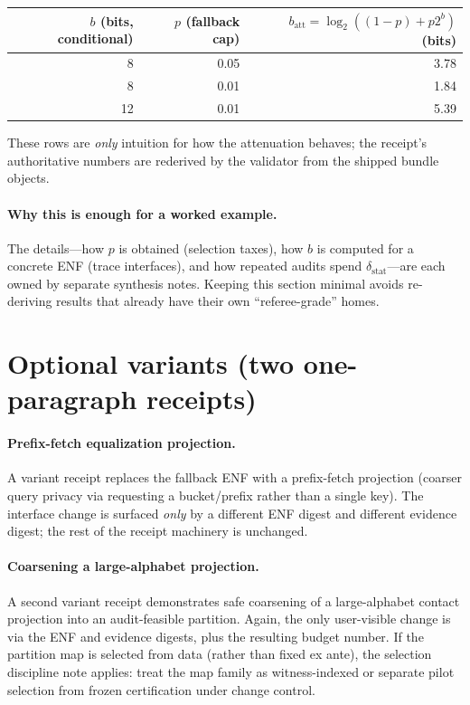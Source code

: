 \documentclass[11pt]{article}
\begin{document}
\begin{center}
\small
\begin{tabular}{@{}r r r@{}}
\toprule
$b$ (bits, conditional) & $p$ (fallback cap) & $b_{\mathrm{att}}=\log_2((1-p)+p2^b)$ (bits)\\
\midrule
8 & 0.05 & 3.78\\
8 & 0.01 & 1.84\\
12 & 0.01 & 5.39\\
\bottomrule
\end{tabular}
\end{center}
\vspace{-0.5em}

\noindent These rows are \emph{only} intuition for how the attenuation behaves; the receipt’s authoritative numbers are rederived by the validator from the shipped bundle objects.

\paragraph{Why this is enough for a worked example.}
The details---how $p$ is obtained (selection taxes), how $b$ is computed for a concrete ENF (trace interfaces), and how repeated audits spend $\delta_{\mathrm{stat}}$---are each owned by separate synthesis notes.\cite{series:fallbacktax,series:traceifaces,series:stataudit,series:anytimespend}
Keeping this section minimal avoids re-deriving results that already have their own ``referee-grade'' homes.

\section{Optional variants (two one-paragraph receipts)}
\paragraph{Prefix-fetch equalization projection.}
A variant receipt replaces the fallback ENF with a prefix-fetch projection (coarser query privacy via requesting a bucket/prefix rather than a single key).
The interface change is surfaced \emph{only} by a different ENF digest and different evidence digest; the rest of the receipt machinery is unchanged.\cite{series:prefixcapacities,series:stataudit}

\paragraph{Coarsening a large-alphabet projection.}
A second variant receipt demonstrates safe coarsening of a large-alphabet contact projection into an audit-feasible partition.
Again, the only user-visible change is via the ENF and evidence digests, plus the resulting budget number.\cite{series:coarsening}
If the partition map is selected from data (rather than fixed ex ante), the selection discipline note applies: treat the map family as witness-indexed or separate pilot selection from frozen certification under change control.\cite{series:selectiondiscipline}
\end{document}

